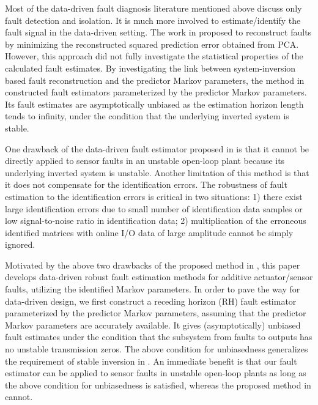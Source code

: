 \documentclass[twocolumn]{autart}
\begin{document}
Most of the data-driven fault diagnosis literature mentioned above discuss only fault detection and isolation. It is much more involved to estimate/identify the fault signal in the data-driven setting. The work in \cite{Alcala2009, Qin2009} proposed to reconstruct faults by minimizing the reconstructed squared prediction error obtained from PCA. However, this approach did not fully investigate the statistical properties of the calculated fault estimates.
By investigating the link between system-inversion based fault reconstruction and the predictor Markov parameters, the method in \cite{Dong2012c} constructed fault estimators parameterized by the predictor Markov parameters. Its fault estimates are asymptotically unbiased as the estimation horizon length tends to infinity, under the condition that the underlying inverted system is stable.

One drawback of the data-driven fault estimator proposed in \cite{Dong2012c} is that it cannot be directly applied to sensor faults in an unstable open-loop plant because its underlying inverted system is unstable. Another limitation of this method is that it does not compensate for the identification errors. The robustness of fault estimation to the identification errors is critical in two situations: 1) there exist large identification errors due to small number of identification data samples or low signal-to-noise ratio in identification data; 2) multiplication of the erroneous identified matrices with online I/O data of large amplitude cannot be simply ignored.

Motivated by the above two drawbacks of the proposed method in \cite{Dong2012c}, this paper develops data-driven robust fault estimation methods for additive actuator/sensor faults, utilizing the identified Markov parameters. In order to pave the way for data-driven design, we first construct a receding horizon (RH) fault estimator parameterized by the predictor Markov parameters, assuming that the predictor Markov parameters are accurately available. It gives (asymptotically) unbiased fault estimates under the condition that the subsystem from faults to outputs has no unstable transmission zeros. The above condition for unbiasedness generalizes the requirement of stable inversion in \cite{Dong2012c}. An immediate benefit is that our fault estimator can be applied to sensor faults in unstable open-loop plants as long as the above condition for unbiasedness is satisfied, whereas the proposed method in \cite{Dong2012c} cannot.
\end{document}
